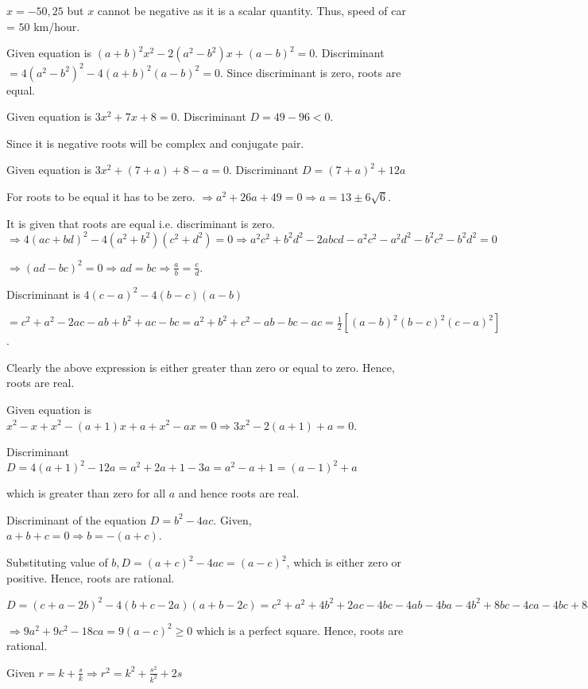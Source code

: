   $x = -50, 25$ but $x$ cannot be negative as it is a scalar quantity. Thus, speed of car = $50$ km/hour.
\item Given equation is $(a + b)^2x^2 - 2(a^2 - b^2)x + (a - b)^2 = 0$. Discriminant $= 4(a^2 - b^2)^2 - 4(a
  + b)^2(a - b)^2 = 0$. Since discriminant is zero, roots are equal.
\item Given equation is $3x^2 + 7x + 8 = 0$. Discriminant $D = 49 - 96 < 0$.

  Since it is negative roots will be complex and conjugate pair.
\item Given equation is $3x^2 + (7 + a) + 8 - a = 0$. Discriminant $D = (7 + a)^2 + 12a$

  For roots to be equal it has to be zero. $\Rightarrow a^2 + 26a + 49 = 0\Rightarrow a = 13 \pm
  6\sqrt{6}$.
\item It is given that roots are equal i.e. discriminant is zero. $\Rightarrow 4(ac + bd)^2 - 4(a^2 +
  b^2)(c^2 + d^2) = 0\Rightarrow a^2c^2 + b^2d^2 - 2abcd - a^2c^2 - a^2d^2 - b^2c^2 - b^2d^2 = 0$

  $\Rightarrow (ad - bc)^2 = 0\Rightarrow ad = bc \Rightarrow \frac{a}{b} = \frac{c}{d}$.
\item Discriminant is $4(c - a)^2 - 4(b - c)(a - b)$

  $= c^2 + a^2 -2ac - ab + b^2 + ac - bc = a^2 + b^2 + c^2 - ab - bc - ac = \frac{1}{2}[(a - b)^2(b - c)^2(c
  - a)^2]$.

  Clearly the above expression is either greater than zero or equal to zero. Hence, roots are real.
\item Given equation is $x^2 - x + x^2 - (a + 1)x + a + x^2 - ax = 0\Rightarrow 3x^2 - 2(a + 1) + a = 0$.

  Discriminant $D = 4(a + 1)^2 - 12a = a^2 + 2a + 1 - 3a = a^2 - a + 1 = (a - 1)^2 + a$

  which is greater than zero for all $a$ and hence roots are real.
\item Discriminant of the equation $D = b^2 - 4ac$. Given, $a + b + c = 0 \Rightarrow b = -(a + c)$.

  Substituting value of $b, D = (a + c)^2 - 4ac = (a - c)^2$, which is either zero or positive. Hence, roots
  are rational.
\item $D = (c + a - 2b)^2 - 4(b + c - 2a)(a + b - 2c) = c^2 + a^2 + 4b^2 + 2ac - 4bc - 4ab -4ba -4b^2 + 8bc
  - 4ca - 4bc + 8c^2 + 8a^2 + 8ab - 8ca$

  $\Rightarrow 9a^2 + 9c^2 - 18ca = 9(a - c)^2 \geq 0$ which is a perfect square. Hence, roots are rational.
\item Given $r = k + \frac{s}{k} \Rightarrow r^2 = k^2 + \frac{s^2}{k^2} + 2s$

